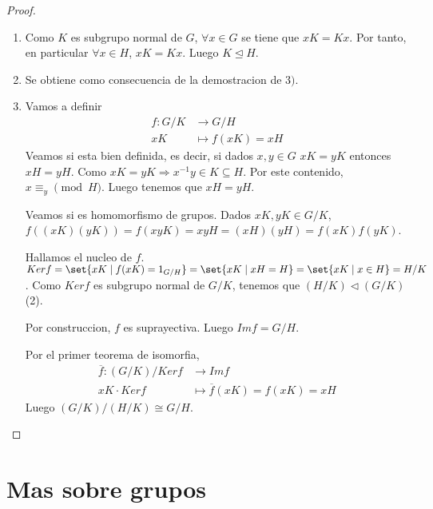 \begin{proof}
	\begin{enumerate}
		\item Como \(K \) es subgrupo normal de \(G \), \(\forall x \in G \) se tiene que \(xK = Kx \). Por tanto, en particular \(\forall x \in H \), \(xK = Kx \). Luego \(K \trianglelefteq H \).
		\item Se obtiene como consecuencia de la demostracion de \(3) \).
		\item Vamos a definir
		      \[
			      \begin{aligned}
				      f \colon G / K & \longrightarrow G / H     \\
				      xK             & \longmapsto f (xK ) = xH
			      \end{aligned}
		      \]
		      Veamos si esta bien definida, es decir, si dados \(x, y \in G \) \(xK = yK \) entonces \(xH = yH \). Como \(xK = yK \Rightarrow x^{-1} y \in K \subseteq H \). Por este contenido, \(x \equiv_ y \pmod H \). Luego tenemos que \(xH = yH \).
		      
		      Veamos si es homomorfismo de grupos. Dados \(xK, yK \in G/ K \), \(f((xK)(yK)) = f(xyK) = xyH = (xH)(yH) = f(xK) f(yK )\).
		      
		      Hallamos el nucleo de \(f \). \(Kerf = \set{x K \mid f(xK) = 1_{G / H}} = \set{x K \mid xH = H} = \set{xK \mid x \in H} = H / K \). Como \(Kerf \) es subgrupo normal de \(G / K \), tenemos que \((H / K) \triangleleft (G / K  )\) (2).
		      
		      Por construccion, \(f \) es suprayectiva. Luego \(Imf = G /H  \).
		      
		      Por el primer teorema de isomorfia,
		      \[
			      \begin{aligned}
				      \overline{f} \colon (G / K) / Kerf & \longrightarrow Imf                          \\
				      xK \cdot Kerf                      & \longmapsto \overline{f} (xK ) = f(xK) = xH
			      \end{aligned}
		      \]
		      Luego \((G / K) / (H / K) \cong G / H \).
	\end{enumerate}
\end{proof}

\section{Mas sobre grupos}
